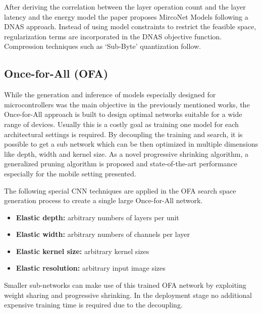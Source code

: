 \documentclass[10pt,        %
               a4paper,     %
               journal,     %
               ]{IEEEtran}
\begin{document}
After deriving the correlation between the layer operation count and the layer latency and the energy model the paper proposes MircoNet Models following a DNAS approach. Instead of using model constraints to restrict the feasible space, regularization terms are incorporated in the DNAS objective function. Compression techniques such as `Sub-Byte' quantization follow. \cite{micronets2020}

\subsection{Once-for-All (OFA)}

While the generation and inference of models especially designed for microcontrollers was the main objective in the previously mentioned works, the Once-for-All approach \cite{once4all2019} is built to design optimal networks suitable for a wide range of devices. Usually this is a costly goal as training one model for each architectural settings is required. By decoupling the training and search, it is possible to get a sub network which can be then optimized in multiple dimensions like depth, width and kernel size. As a novel progressive shrinking algorithm, a generalized pruning algorithm is proposed and state-of-the-art performance especially for the mobile setting presented.

The following special CNN techniques are applied in the OFA search space generation process to create a single large Once-for-All network.

\begin{itemize}
    \item \textbf{Elastic depth:} arbitrary numbers of layers per unit
    \item \textbf{Elastic width:} arbitrary numbers of channels per layer
    \item \textbf{Elastic kernel size:} arbitrary kernel sizes
    \item \textbf{Elastic resolution:} arbitrary input image sizes
\end{itemize}

Smaller sub-networks can make use of this trained OFA network by exploiting weight sharing and progressive shrinking. In the deployment stage no additional expensive training time is required due to the decoupling. \cite{once4all2019}



\end{document}
